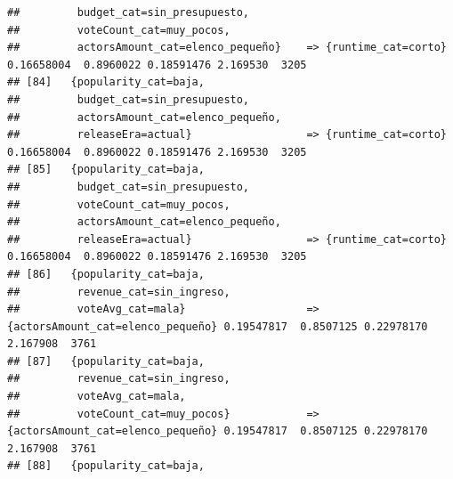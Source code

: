 \documentclass[
]{article}
\begin{document}
\begin{verbatim}
##         budget_cat=sin_presupuesto,                                                                                             
##         voteCount_cat=muy_pocos,                                                                                                
##         actorsAmount_cat=elenco_pequeño}    => {runtime_cat=corto}               0.16658004  0.8960022 0.18591476 2.169530  3205
## [84]   {popularity_cat=baja,                                                                                                    
##         budget_cat=sin_presupuesto,                                                                                             
##         actorsAmount_cat=elenco_pequeño,                                                                                        
##         releaseEra=actual}                  => {runtime_cat=corto}               0.16658004  0.8960022 0.18591476 2.169530  3205
## [85]   {popularity_cat=baja,                                                                                                    
##         budget_cat=sin_presupuesto,                                                                                             
##         voteCount_cat=muy_pocos,                                                                                                
##         actorsAmount_cat=elenco_pequeño,                                                                                        
##         releaseEra=actual}                  => {runtime_cat=corto}               0.16658004  0.8960022 0.18591476 2.169530  3205
## [86]   {popularity_cat=baja,                                                                                                    
##         revenue_cat=sin_ingreso,                                                                                                
##         voteAvg_cat=mala}                   => {actorsAmount_cat=elenco_pequeño} 0.19547817  0.8507125 0.22978170 2.167908  3761
## [87]   {popularity_cat=baja,                                                                                                    
##         revenue_cat=sin_ingreso,                                                                                                
##         voteAvg_cat=mala,                                                                                                       
##         voteCount_cat=muy_pocos}            => {actorsAmount_cat=elenco_pequeño} 0.19547817  0.8507125 0.22978170 2.167908  3761
## [88]   {popularity_cat=baja,                                                                                                    

\end{verbatim}
\end{document}
